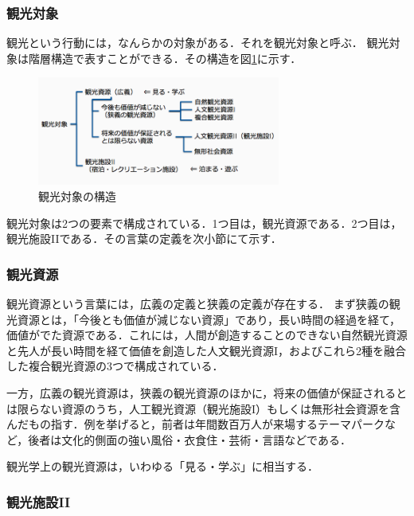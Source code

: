 \documentclass{jsarticle}
\begin{document}
\subsubsection{観光対象}

観光という行動には，なんらかの対象がある．それを観光対象と呼ぶ\cite{yokomizo_1998}．
観光対象は階層構造で表すことができる．その構造を図\ref{tourism_type}に示す．


\begin{figure}[!ht]
\begin{center}
\includegraphics[width=8.0cm]{./image/tourism_type.png}
\caption{観光対象の構造}
\label{tourism_type}
\end{center}
\end{figure}



観光対象は2つの要素で構成されている．1つ目は，観光資源である．2つ目は，観光施設IIである．その言葉の定義を次小節にて示す．

\subsubsection{観光資源}

観光資源という言葉には，広義の定義と狭義の定義が存在する．
まず狭義の観光資源とは，「今後とも価値が減じない資源」であり，長い時間の経過を経て，価値がでた資源である．これには，人間が創造することのできない自然観光資源と先人が長い時間を経て価値を創造した人文観光資源I，およびこれら2種を融合した複合観光資源の3つで構成されている．

一方，広義の観光資源は，狭義の観光資源のほかに，将来の価値が保証されるとは限らない資源のうち，人工観光資源（観光施設I）もしくは無形社会資源を含んだもの指す．例を挙げると，前者は年間数百万人が来場するテーマパークなど，後者は文化的側面の強い風俗・衣食住・芸術・言語などである．

観光学上の観光資源は，いわゆる「見る・学ぶ」に相当する．

\subsubsection{観光施設II}
\end{document}
